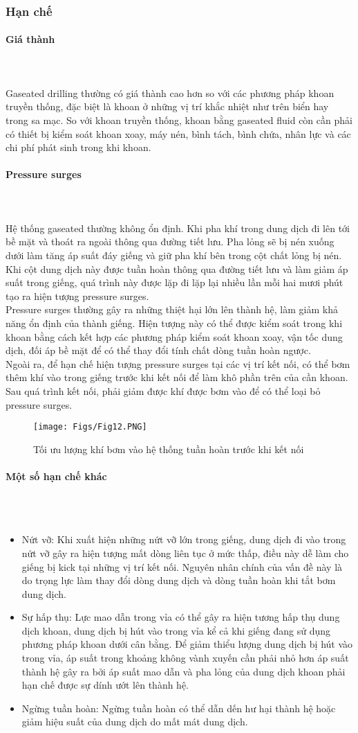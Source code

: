 \documentclass[12pt,a4paper]{article}
\newcommand{\subsubsubsection}[1]{\paragraph{#1}\mbox{}\\}
\begin{document}
\subsubsection{Hạn chế}
	\subsubsubsection{Giá thành}\\
	Gaseated drilling thường có giá thành cao hơn so với các phương pháp khoan truyền thống, đặc biệt là khoan ở những vị trí khắc nhiệt như trên biển hay trong sa mạc. So với khoan truyền thống, khoan bằng gaseated fluid còn cần phải có thiết bị kiểm soát khoan xoay, máy nén, bình tách, bình chứa, nhân lực và các chi phí phát sinh trong khi khoan. 
	\subsubsubsection{Pressure surges}\\
	Hệ thống gaseated thường không ổn định. Khi pha khí trong dung dịch đi lên tới bề mặt và thoát ra ngoài thông qua đường tiết lưu. Pha lỏng sẽ bị nén xuống dưới làm tăng áp suất đáy giếng và giữ pha khí bên trong cột chất lỏng bị nén. Khi cột dung dịch này được tuần hoàn thông qua đường tiết lưu và làm giảm áp suất trong giếng, quá trình này được lặp đi lặp lại nhiều lần mỗi hai mươi phút tạo ra hiện tượng pressure surges.\\
	Pressure surges thường gây ra những thiệt hại lớn lên thành hệ, làm giảm khả năng ổn định của thành giếng. Hiện tượng này có thể được kiểm soát trong khi khoan bằng cách kết hợp các phương pháp kiểm soát khoan xoay, vận tốc dung dịch, đối áp bề mặt để có thể thay đổi tính chất dòng tuần hoàn ngược.\\
	Ngoài ra, để hạn chế hiện tượng pressure surges tại các vị trí kết nối, có thể bơm thêm khí vào trong giếng trước khi kết nối để làm khô phần trên của cần khoan. Sau quá trình kết nối, phải giảm được khí được bơm vào để có thể loại bỏ pressure surges.
	\begin{figure}[h]
	\centering
	\texttt{[image: Figs/Fig12.PNG]}
	\caption{Tối ưu lượng khí bơm vào hệ thống tuần hoàn trước khi kết nối\cite{rehm2013underbalanced}}
	\end{figure}
	\subsubsubsection{Một số hạn chế khác}\\
		\begin{itemize}
			\item Nứt vỡ: Khi xuất hiện những nứt vỡ lớn trong giếng, dung dịch đi vào trong nứt vỡ gây ra hiện tượng mất dòng liên tục ở mức thấp, điều này dễ làm cho giếng bị kick tại những vị trí kết nối. Nguyên nhân chính của vấn đề này là do trọng lực làm thay đổi dòng dung dịch và dòng tuần hoàn khi tắt bơm dung dịch.
			\item Sự hấp thụ: Lực mao dẫn trong vỉa có thể gây ra hiện tương hấp thụ dung dịch khoan, dung dịch bị hút vào trong vỉa kể cả khi giếng đang sử dụng phương pháp khoan dưới cân bằng. Để giảm thiểu lượng dung dịch bị hút vào trong vỉa, áp suất trong khoảng không vành xuyến cần phải nhỏ hơn áp suất thành hệ gây ra bởi áp suất mao dẫn và pha lỏng của dung dịch khoan phải hạn chế được sự dính ướt lên thành hệ.
			\item Ngừng tuần hoàn: Ngừng tuần hoàn có thể dẫn dến hư hại thành hệ hoặc giảm hiệu suất của dung dịch do mất mát dung dịch.
		\end{itemize}
\end{document}
